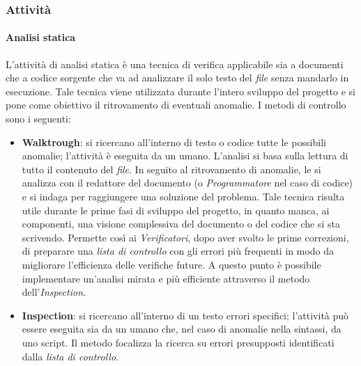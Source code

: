 \subsubsection{Attività}
\paragraph{Analisi statica}
L'attività di analisi statica è una tecnica di verifica applicabile sia a documenti che a codice sorgente che va ad analizzare il solo testo del \textit{file} senza mandarlo in esecuzione. Tale tecnica viene utilizzata durante l'intero sviluppo del progetto e si pone come obiettivo il ritrovamento di eventuali anomalie. I metodi di controllo sono i seguenti:
\begin{itemize}
	\item \textbf{Walktrough}: si ricercano all'interno di testo o codice tutte le possibili anomalie; l'attività è eseguita da un umano. L'analisi si basa sulla lettura di tutto il contenuto del \textit{file}. In seguito al ritrovamento di anomalie, le si analizza con il redattore del documento (o \textit{Programmatore} nel caso di codice) e si indaga per raggiungere una soluzione del problema. Tale tecnica risulta utile durante le prime fasi di sviluppo del progetto, in quanto manca, ai componenti, una visione complessiva del documento o del codice che si sta scrivendo. Permette così ai \textit{Verificatori}, dopo aver svolto le prime correzioni, di preparare una \textit{lista di controllo} con gli errori più frequenti in modo da migliorare l'efficienza delle verifiche future. A questo punto è possibile implementare un'analisi mirata e più efficiente attraverso il metodo dell'\textit{Inspection}.
	\item \textbf{Inspection}: si ricercano all'interno di un testo errori specifici; l'attività può essere eseguita sia da un umano che, nel caso di anomalie nella sintassi, da uno script. Il metodo focalizza la ricerca su errori presupposti identificati dalla \textit{lista di controllo}.
\end{itemize}
